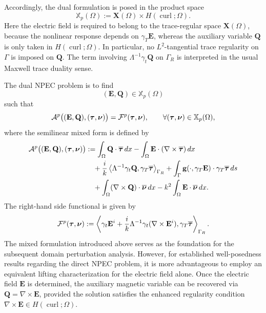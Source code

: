 \documentclass[10pt,a4paper]{amsart}
\numberwithin{equation}{section}
\begin{document}
Accordingly, the dual  formulation is posed in the product space
\[
\mathbb X_p(\Omega)
:=
\mathbf X(\Omega)\times H(\operatorname{curl};\Omega).
\]
Here the electric field is required to belong to the trace-regular space
\(\mathbf X(\Omega)\), because the nonlinear response depends on
\(\gamma_T\mathbf E\), whereas the auxiliary variable \(\mathbf Q\) is only
taken in \(H(\operatorname{curl};\Omega)\). In particular, no \(L^2\)-tangential
trace regularity on \(\Gamma\) is imposed on \(\mathbf Q\). The term involving
\(\Lambda^{-1}\gamma_t\mathbf Q\) on \(\Gamma_R\) is interpreted in the usual
Maxwell trace duality sense.

The dual NPEC problem is to find
\[
(\mathbf E,\mathbf Q)\in\mathbb X_p(\Omega)
\]
such that
\begin{equation}\label{eq:mixed_formulation}
\mathcal A^{\rm p}
\bigl((\mathbf E,\mathbf Q),(\boldsymbol\tau,\boldsymbol\nu)\bigr)
=
\mathcal F^{\rm p}(\boldsymbol\tau,\boldsymbol\nu),
\qquad
\forall(\boldsymbol\tau,\boldsymbol\nu)\in\mathbb X_p(\Omega),
\end{equation}
where the semilinear mixed form is defined by
\begin{equation}\label{eq:mixed_form}
\begin{aligned}
\mathcal A^{\rm p}
\bigl((\mathbf E,\mathbf Q),(\boldsymbol\tau,\boldsymbol\nu)\bigr)
&:=
\int_\Omega
\mathbf Q\cdot\overline{\boldsymbol\tau}\,dx
-
\int_\Omega
\mathbf E\cdot(\nabla\times\overline{\boldsymbol\tau})\,dx\\
&\quad
+
\frac{i}{k}
\left\langle
\Lambda^{-1}\gamma_t\mathbf Q,
\gamma_T\overline{\boldsymbol\tau}
\right\rangle_{\Gamma_R}
+
\int_\Gamma
\mathbf g(\cdot,\gamma_T\mathbf E)
\cdot
\gamma_T\overline{\boldsymbol\tau}\,ds\\
&\quad+
\int_\Omega
(\nabla\times\mathbf Q)\cdot\overline{\boldsymbol\nu}\,dx-
k^2
\int_\Omega
\mathbf E\cdot\overline{\boldsymbol\nu}\,dx .
\end{aligned}
\end{equation}
The right-hand side functional is given by
\begin{equation}\label{eq:mixed_rhs}
\mathcal F^{\rm p}(\boldsymbol\tau,\boldsymbol\nu)
:=
\left\langle
\gamma_t\mathbf E^i
+
\frac{i}{k}\Lambda^{-1}\gamma_t(\nabla\times\mathbf E^i),
\gamma_T\overline{\boldsymbol\tau}
\right\rangle_{\Gamma_R}.
\end{equation}
The mixed formulation introduced above serves as the foundation for the subsequent domain perturbation analysis. However, for established well-posedness results regarding the direct NPEC problem, it is more advantageous to employ an equivalent lifting characterization for the electric field alone. Once the electric field $\mathbf{E}$ is determined, the auxiliary magnetic variable can be recovered via $\mathbf{Q} = \nabla \times \mathbf{E}$, provided the solution satisfies the enhanced regularity condition $\nabla \times \mathbf{E} \in H(\operatorname{curl};\Omega)$.
\end{document}

